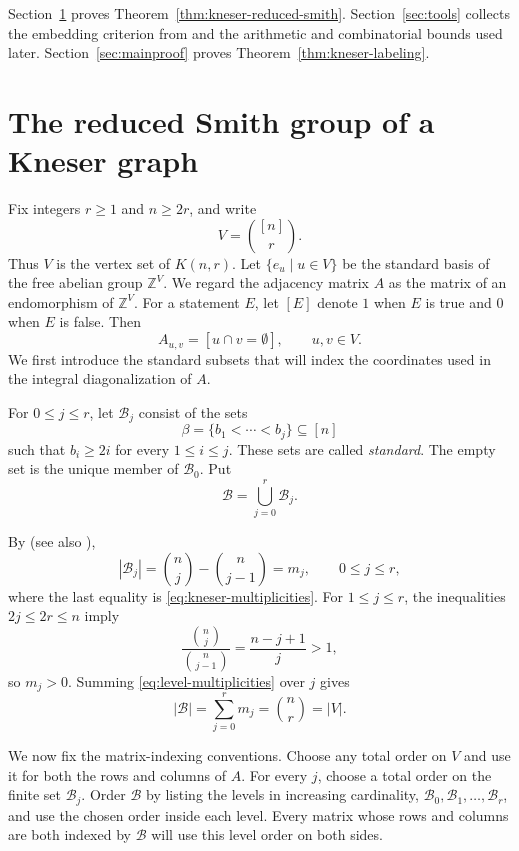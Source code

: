 \documentclass[11pt,reqno]{amsart}
\theoremstyle{plain}
\theoremstyle{definition}
\theoremstyle{remark}
\begin{document}
Section~\ref{sec:knesersmith} proves
Theorem~\ref{thm:kneser-reduced-smith}. Section~\ref{sec:tools} collects the
embedding criterion from \cite{Bat26} and the arithmetic and combinatorial
bounds used later. Section~\ref{sec:mainproof}  proves
Theorem~\ref{thm:kneser-labeling}.

\section{The reduced Smith group of a Kneser graph}\label{sec:knesersmith}

Fix integers $r\ge1$ and $n\ge2r$, and write
\[
  V=\binom{[n]}r.
\]
Thus $V$ is the vertex set of $K(n,r)$. Let
$\{e_u\mid u\in V\}$ be the standard basis of the free abelian group
$\mathbb Z^V$. We regard the adjacency matrix $A$ as the matrix of an
endomorphism of $\mathbb Z^V$. For a statement $E$, let $[E]$ denote $1$ when
$E$ is true and $0$ when $E$ is false. Then
\[
  A_{u,v}=[u\cap v=\emptyset],
  \qquad u,v\in V.
\]
We first introduce the standard subsets that will index the coordinates used
in the integral diagonalization of $A$.

For $0\le j\le r$, let $\mathcal B_j$ consist of the sets
\[
  \beta=\{b_1<\cdots<b_j\}\subseteq[n]
\]
such that $b_i\ge2i$ for every $1\le i\le j$. These sets are called
\emph{standard}. The empty set is the unique member of
$\mathcal B_0$. Put
\[
  \mathcal B=\bigcup_{j=0}^r\mathcal B_j.
\]

By \cite{DEGJPP25} (see also \cite[Claim~2.1]{Fra90}),
\begin{equation}\label{eq:level-multiplicities}
  |\mathcal B_j|
  =\binom nj-\binom n{j-1}
  =m_j,
  \qquad 0\le j\le r,
\end{equation}
where the last equality is
\eqref{eq:kneser-multiplicities}. For
$1\le j\le r$, the inequalities
$2j\le2r\le n$ imply
\[
  \frac{\binom nj}{\binom n{j-1}}
  =\frac{n-j+1}{j}>1,
\]
so $m_j>0$. Summing \eqref{eq:level-multiplicities} over $j$ gives
\[
  |\mathcal B|
  =\sum_{j=0}^r m_j
  =\binom nr
  =|V|.
\]

We now fix the matrix-indexing conventions. Choose any total order on $V$ and
use it for both the rows and columns of $A$. For every $j$, choose a total
order on the finite set $\mathcal B_j$. Order $\mathcal B$ by listing the
levels in increasing cardinality,
$\mathcal B_0,\mathcal B_1,\dots,\mathcal B_r$, and use the chosen order
inside each level. Every matrix whose rows and columns are both indexed by
$\mathcal B$ will use this level order on both sides.
\end{document}
